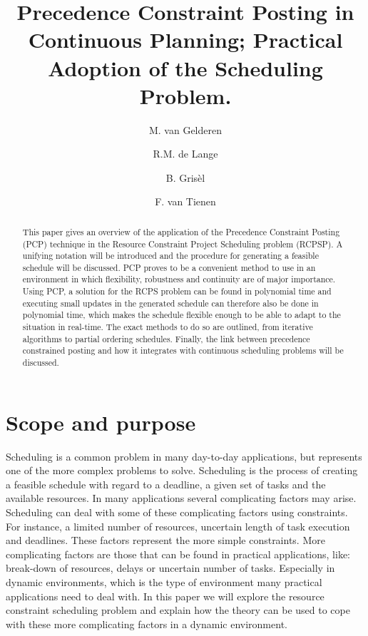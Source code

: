 \documentclass{article}
\title{Precedence Constraint Posting in Continuous Planning; Practical Adoption of the Scheduling Problem.}
\author{M. van Gelderen  \and
    R.M. de Lange \and
    B. Gris\`el \and
    F. van Tienen}
\date{}
\begin{document}
\maketitle
\thispagestyle{empty}

\begin{abstract}
This paper gives an overview of the application of the Precedence Constraint Posting (PCP) technique in the Resource Constraint Project Scheduling problem (RCPSP). A unifying notation will be introduced and the procedure for generating a feasible schedule will be discussed. PCP proves to be a convenient method to use in an environment in which flexibility, robustness and continuity are of major importance. Using PCP, a solution for the RCPS problem can be found in polynomial time and executing small updates in the generated schedule can therefore also be done in polynomial time, which makes the schedule flexible enough to be able to adapt to the situation in real-time. The exact methods to do so are outlined, from iterative algorithms to partial ordering schedules. Finally, the link between precedence constrained posting and how it integrates with continuous scheduling problems will be discussed.
\end{abstract}

\newpage

\section{Scope and purpose}
Scheduling is a common problem in many day-to-day applications, but represents one of the more complex problems to solve.
Scheduling is the process of creating a feasible schedule with regard to a deadline, a given set of tasks and the available resources.
In many applications several complicating factors may arise.
Scheduling can deal with some of these complicating factors using constraints.
For instance, a limited number of resources, uncertain length of task execution and deadlines.
These factors represent the more simple constraints.
More complicating factors are those that can be found in practical applications, like: break-down of resources, delays or uncertain number of tasks.
Especially in dynamic environments, which is the type of environment many practical applications need to deal with.
In this paper we will explore the resource constraint scheduling problem and explain how the theory can be used to cope with these more complicating factors in a dynamic environment.
\end{document}
